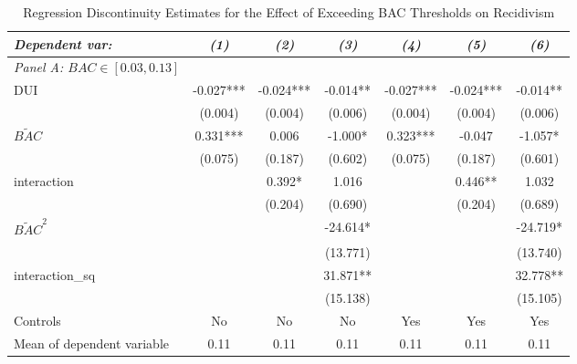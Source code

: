 \documentclass[11pt]{article}\usepackage[]{graphicx}\usepackage[]{color}
\begin{document}
\begin{enumerate}
\begin{table}[htbp]\centering
\small
\caption{Regression Discontinuity Estimates for the Effect of Exceeding BAC Thresholds on Recidivism}
\label{table:mainreg}
\begin{center}
\begin{threeparttable}
\begin{tabular}{l*{6}{c}}
\toprule
\multicolumn{1}{l}{\textit{Dependent var: }}&
\multicolumn{1}{c}{\textit{(1)}}&
\multicolumn{1}{c}{\textit{(2)}}&
\multicolumn{1}{c}{\textit{(3)}}&
\multicolumn{1}{c}{\textit{(4)}}&
\multicolumn{1}{c}{\textit{(5)}}&
\multicolumn{1}{c}{\textit{(6)}}\\
\midrule
\textit{Panel A: $BAC \in [0.03, 0.13]$ } & & & & & & \\
DUI                 &      -0.027***&      -0.024***&      -0.014** &      -0.027***&      -0.024***&      -0.014** \\
                    &     (0.004)   &     (0.004)   &     (0.006)   &     (0.004)   &     (0.004)   &     (0.006)   \\
$\tilde{BAC}$            &       0.331***&       0.006   &      -1.000*  &       0.323***&      -0.047   &      -1.057*  \\
                    &     (0.075)   &     (0.187)   &     (0.602)   &     (0.075)   &     (0.187)   &     (0.601)   \\
interaction         &               &       0.392*  &       1.016   &               &       0.446** &       1.032   \\
                    &               &     (0.204)   &     (0.690)   &               &     (0.204)   &     (0.689)   \\
$\tilde{BAC}^2$            &               &               &     -24.614*  &               &               &     -24.719*  \\
                    &               &               &    (13.771)   &               &               &    (13.740)   \\
interaction\_sq      &               &               &      31.871** &               &               &      32.778** \\
                    &               &               &    (15.138)   &               &               &    (15.105)   \\
\midrule
Controls   & No			& No			& No 	& Yes 		& Yes 		& Yes  \\
Mean of dependent variable&        0.11   &        0.11   &        0.11   &        0.11   &        0.11   &        0.11   \\

\end{tabular}
\end{threeparttable}
\end{center}
\end{table}
\end{enumerate}
\end{document}

